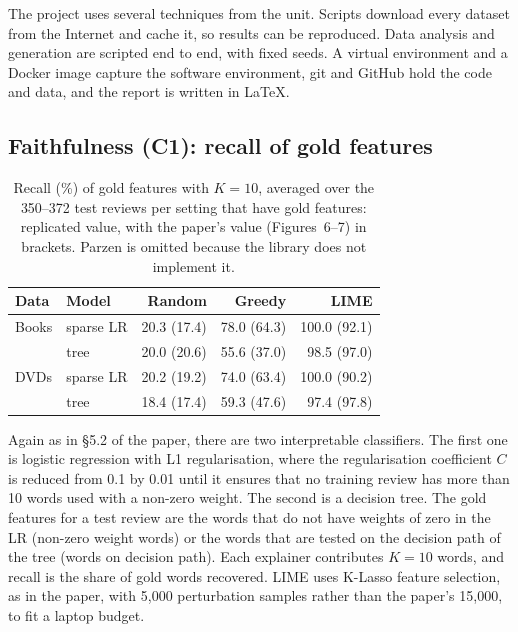 \documentclass[11pt]{article}
\begin{document}
The project uses several techniques from the unit. Scripts download every dataset from the Internet and cache it, so results can be reproduced. Data analysis and generation are scripted end to end, with fixed seeds. A virtual environment and a Docker image capture the software environment, git and GitHub hold the code and data, and the report is written in \LaTeX.

\subsection{Faithfulness (C1): recall of gold features}

\begin{table}[t]
\centering\small
\setlength{\tabcolsep}{4pt}
\begin{tabular}{@{}llrrr@{}}
\toprule
Data & Model & Random & Greedy & LIME \\
\midrule
Books & sparse LR & 20.3 (17.4) & 78.0 (64.3) & 100.0 (92.1) \\
      & tree      & 20.0 (20.6) & 55.6 (37.0) & 98.5 (97.0) \\
DVDs  & sparse LR & 20.2 (19.2) & 74.0 (63.4) & 100.0 (90.2) \\
      & tree      & 18.4 (17.4) & 59.3 (47.6) & 97.4 (97.8) \\
\bottomrule
\end{tabular}
\caption{Recall (\%) of gold features with $K=10$, averaged over the 350--372 test reviews per setting that have gold features: replicated value, with the paper's value (Figures~6--7) in brackets. Parzen is omitted because the library does not implement it.}
\label{tab:recall}
\end{table}

Again as in \S5.2 of the paper, there are two interpretable classifiers. The first one is logistic regression with L1 regularisation, where the regularisation coefficient $C$ is reduced from 0.1 by 0.01 until it ensures that no training review has more than 10 words used with a non-zero weight. The second is a decision tree. The gold features for a test review are the words that do not have weights of zero in the LR (non-zero weight words) or the words that are tested on the decision path of the tree (words on decision path). Each explainer contributes $K = 10$ words, and recall is the share of gold words recovered. LIME uses K-Lasso feature selection, as in the paper, with 5,000 perturbation samples rather than the paper's 15,000, to fit a laptop budget.
\end{document}
